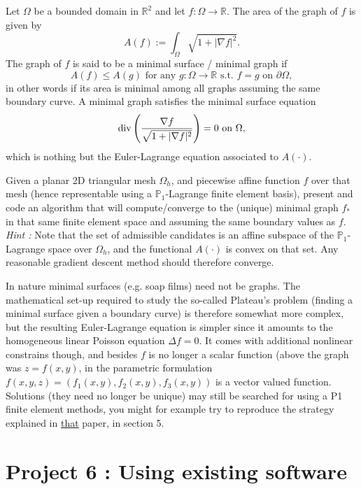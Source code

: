 \documentclass[11pt]{article}
\newcommand{\R}{\mathbb{R}}
\begin{document}
Let $\Omega$ be a bounded domain in $\R^2$ and let $f : \Omega \to \R.$ 
The area of the graph of $f$ is given by 
$$
A(f) := \int_\Omega \sqrt{1+ |\nabla f|^2}. 
$$
The graph of $f$ is said to be a minimal surface / minimal graph if
$$
A(f) \leq A(g) \text{ for any } g:\Omega \to \R \text{ s.t. } f=g \text{ on }
\partial \Omega,
$$
in other words if its area is minimal among all graphs assuming the same boundary curve.
A minimal graph satisfies the minimal surface equation 
$$
{\rm div}\left( \frac{\nabla f}{\sqrt{1 + |\nabla f|^2}}\right) = 0 \text{ on } \Omega,
$$
which is nothing but the Euler-Lagrange equation associated to $A(\cdot).$

Given a planar 2D triangular mesh $\Omega_h$, and piecewise affine 
function $f$ over that mesh (hence representable using a $\mathbb{P}_1$-Lagrange finite
element basis), present and code an algorithm that will compute/converge to the
(unique) minimal graph $f_*$ in that same finite element space and assuming
the same boundary values as $f$.\\
{\it Hint :} Note that the set of admissible candidates is an affine subspace of
the $\mathbb{P}_1$-Lagrange space over $\Omega_h$, and the functional $A(\cdot)$ is convex on that
set. Any reasonable gradient descent method should therefore converge.
 
In nature minimal surfaces (e.g. soap films) need not be graphs. The mathematical 
set-up required to study 
the so-called Plateau's problem (finding a minimal surface given a boundary
curve) is therefore somewhat more complex, but the resulting Euler-Lagrange
equation is simpler since it amounts to the homogeneous linear Poisson equation
$\Delta f = 0.$ It comes with additional nonlinear constrains though, and
besides $f$ is no longer a scalar function (above the graph was $z = f(x,y)$, 
in the parametric formulation $f(x,y,z) = (f_1(x,y), f_2(x,y), f_3(x,y))$ is
a vector valued function. Solutions (they need no longer be unique) may still be searched 
for using a P1 finite element methods, you might for example try to reproduce the 
strategy explained in \href{https://eudml.org/doc/221286}{that} paper, in section 5.

\pagebreak
\section*{Project 6 : Using existing software}
\end{document}
